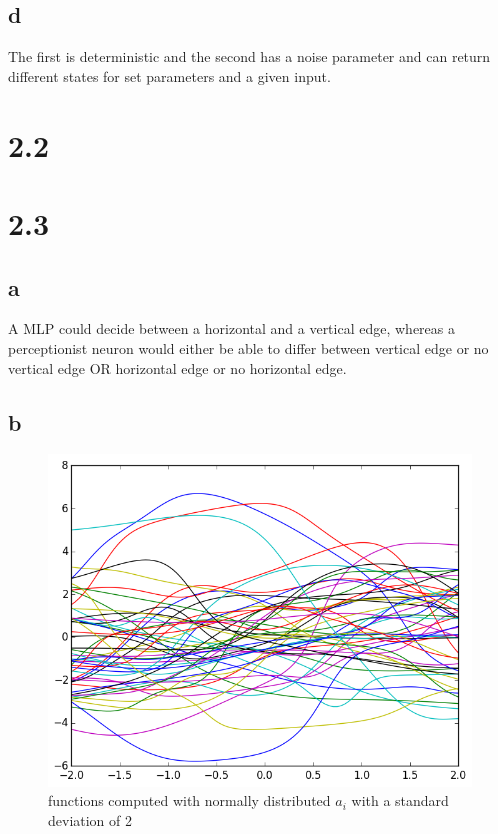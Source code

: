 \documentclass[11pt,a4paper]{article}
\begin{document}
\subsection*{d}
The first is deterministic and the second has a noise parameter and can return different states for set parameters and a given
input.
\section*{2.2}
\section*{2.3}
\subsection*{a}
A MLP could decide between a horizontal and a vertical edge, whereas a perceptionist neuron would either be able to differ between
vertical edge or no vertical edge OR horizontal edge or no horizontal edge.
\subsection*{b}
\begin{figure}[h]
\centering
 \includegraphics[width=\textwidth]{./2_3_std=2.png}
\caption{functions computed with normally distributed $a_i$ with a standard deviation of 2}
\end{figure}
\newpage
\end{document}
